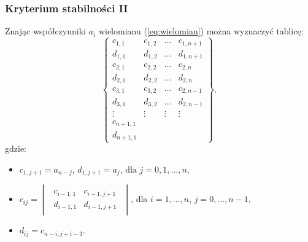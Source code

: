 \documentclass{article}
\begin{document}
        \subsubsection{Kryterium stabilności II}
        Znając współczynniki $a_{i}$ wielomianu (\ref{eq:wielomian}) można wyznaczyć tablicę:
        \begin{equation}
            \label{eq:kryterium_tablica}
            \left\{
            \begin{array}{cccc}
                c_{1,1} &   c_{1,2} &   \dots   &   c_{1,n+1} \\
                d_{1,1} &   d_{1,2} &   \dots   &   d_{1,n+1} \\
                c_{2,1} &   c_{2,2} &   \dots   &   c_{2,n} \\
                d_{2,1} &   d_{2,2} &   \dots   &   d_{2,n} \\
                c_{3,1} &   c_{3,2} &   \dots   &   c_{2,n-1} \\
                d_{3,1} &   d_{3,2} &   \dots   &   d_{2,n-1} \\
                \vdots  &   \vdots  &   \vdots  &   \vdots\\
                c_{n+1, 1}  & & &\\
                d_{n+1, 1}  & & &
            \end{array}
            \right\},
        \end{equation}
        gdzie:
        \begin{itemize}
            \item $c_{1,j+1} = a_{n-j}$, $d_{1,j+1} = a_{j}$, dla $j=0, 1, \dots, n$,
            \item 
            $
                c_{ij}
                =
                \begin{vmatrix}
                \begin{array}{cc}
                    c_{i-1,1}   &   c_{i-1,j+1}\\
                    d_{i-1,1}   &   d_{i-1,j+1}
                \end{array}
                \end{vmatrix}
            $, dla $i = 1, \dots, n$, $j = 0, \dots, n-1$,
            \item $d_{ij} = c_{n-i,j+i-3}$.
        \end{itemize}
\end{document}
